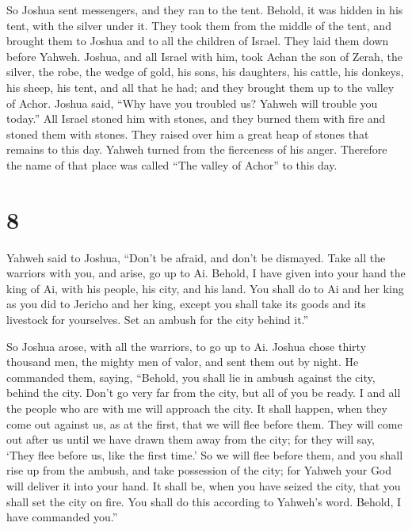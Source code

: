  So Joshua sent messengers, and they ran to the tent.
Behold, it was hidden in his tent, with the silver under it.
 They took them from the middle of the tent, and brought
them to Joshua and to all the children of Israel. They laid them down
before Yahweh.  Joshua, and all Israel with him, took
Achan the son of Zerah, the silver, the robe, the wedge of gold, his
sons, his daughters, his cattle, his donkeys, his sheep, his tent, and
all that he had; and they brought them up to the valley of Achor.
 Joshua said, ``Why have you troubled us? Yahweh will
trouble you today.'' All Israel stoned him with stones, and they burned
them with fire and stoned them with stones.  They raised
over him a great heap of stones that remains to this day. Yahweh turned
from the fierceness of his anger. Therefore the name of that place was
called ``The valley of Achor'' to this day.

\hypertarget{section-7}{%
\section{8}\label{section-7}}

 Yahweh said to Joshua, ``Don't be afraid, and don't be
dismayed. Take all the warriors with you, and arise, go up to Ai.
Behold, I have given into your hand the king of Ai, with his people, his
city, and his land.  You shall do to Ai and her king as
you did to Jericho and her king, except you shall take its goods and its
livestock for yourselves. Set an ambush for the city behind it.''

 So Joshua arose, with all the warriors, to go up to Ai.
Joshua chose thirty thousand men, the mighty men of valor, and sent them
out by night.  He commanded them, saying, ``Behold, you
shall lie in ambush against the city, behind the city. Don't go very far
from the city, but all of you be ready.  I and all the
people who are with me will approach the city. It shall happen, when
they come out against us, as at the first, that we will flee before
them.  They will come out after us until we have drawn
them away from the city; for they will say, `They flee before us, like
the first time.' So we will flee before them,  and you
shall rise up from the ambush, and take possession of the city; for
Yahweh your God will deliver it into your hand.  It shall
be, when you have seized the city, that you shall set the city on fire.
You shall do this according to Yahweh's word. Behold, I have commanded
you.''

